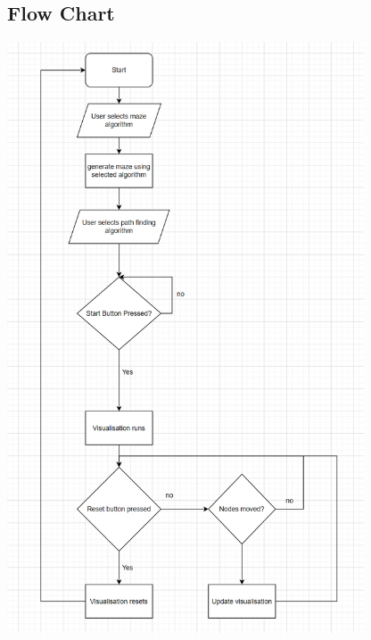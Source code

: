 \documentclass{article}
\newcommand{\comment}[1]{}
\begin{document}
\subsection{Flow Chart}
\includegraphics[width=\linewidth, height=17.5cm]{assets/flow chart.PNG}

\comment{
\begin{tikzpicture}[node distance = 2cm, auto]
    \node[start] (init) {start};
    \node [io, below of = init] (1) {User selects maze algorithm};
    \node[block, below of = 1] (2) {Generate maze using selected algorithm};
    \node [io, below of=2](3){User selects path finding algorithm};
    \node[decision, below of=3](4){Start button pressed?};
    \node[block, below of=4, yshift=-1cm](5){Visualization runs};
    \node[decision, below of=5](6){Reset button pressed?};
    \node[decision, right of=6, xshift=1cm](7){Nodes moved?};
    \node[block, below of=7, xshift=0.25cm, yshift=-0.5cm](8){Update visualization};
    \node[block, below of=6, yshift=-0.5cm](9){Visualization resets};

    \path[line] (init) -- (1);
    \path[line] (1) -- (2);
    \path[line] (2) -- (3);
    \path[line] (3) -- (4);
    \path[line] (4) -- node {no}(4);
    \path[line] (4) -- node {yes}(5);
    \path[line] (5) -- (6);
    \path[line] (6) -- node {no}(7);
    \path[line] (6) -- node {yes}(9);
    \path[line] (7) -- node {yes}(8);
    \path[line] (7) -- node {no}(6);
    \path[line] (8) -- (6);
    \path[line, anchor=west] (9) -- (init);
\end{tikzpicture}}
\end{document}
